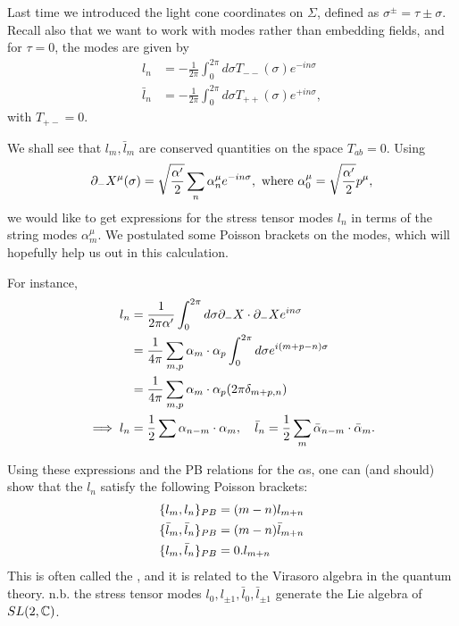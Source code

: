 Last time we introduced the light cone coordinates on $\Sigma$, defined as $\sigma^\pm = \tau \pm \sigma$. Recall also that we want to work with modes rather than embedding fields, and for $\tau=0$, the modes are given by
\begin{align*}
    l_n &= -\frac{1}{2\pi}\int_0^{2\pi} d\sigma T_{--}(\sigma) e^{-in\sigma}\\
    \bar l_n &= -\frac{1}{2\pi}\int_0^{2\pi} d\sigma T_{++}(\sigma) e^{+in\sigma},
\end{align*}
with $T_{+-}=0$.

We shall see that $l_m,\bar l_m$ are conserved quantities on the space $T_{ab}=0$. Using
\begin{equation*}
    \partial_- X^\mu (\sigma) =\sqrt{\frac{\alpha'}{2}}\sum_n \alpha_n^\mu e^{-in\sigma},\text{ where } \alpha_0^\mu = \sqrt{\frac{\alpha'}{2}} p^\mu,
\end{equation*}
we would like to get expressions for the stress tensor modes $l_n$ in terms of the string modes $\alpha_m^\mu$. We postulated some Poisson brackets on the modes, which will hopefully help us out in this calculation.

For instance,
\begin{align*}
    l_n &= \frac{1}{2\pi \alpha'} \int_0^{2\pi} d\sigma \partial_- X \cdot \partial_- X e^{in\sigma}\\
        &= \frac{1}{4\pi} \sum_{m,p} \alpha_m \cdot \alpha_p \int_0^{2\pi} d\sigma e^{i(m+p-n)\sigma}\\
        &= \frac{1}{4\pi} \sum_{m,p} \alpha_m \cdot \alpha_p (2\pi \delta_{m+p,n})\\
        \implies l_n &= \frac{1}{2} \sum \alpha_{n-m} \cdot \alpha_m, \quad \bar l_n =\frac{1}{2} \sum_m \bar \alpha_{n-m} \cdot \bar \alpha_m.
\end{align*}

Using these expressions and the PB relations for the $\alpha$s, one can (and should) show that the $l_n$ satisfy the following Poisson brackets:
\begin{align*}
    \{l_m,l_n\}_{PB} &= (m-n) l_{m+n}\\
    \{\bar l_m,\bar l_n\}_{PB} &= (m-n) \bar l_{m+n}\\
    \{l_m,\bar l_n\}_{PB} &= 0. l_{m+n}
\end{align*}
This is often called the , and it is related to the Virasoro algebra in the quantum theory. n.b. the stress tensor modes $l_0,l_{\pm 1}, \bar l_0, \bar l_{\pm 1}$ generate the Lie algebra of $SL(2,\mathbb{C})$.

